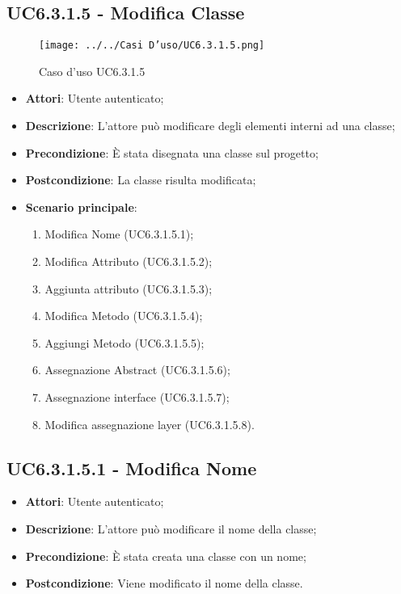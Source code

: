 \subsection{UC6.3.1.5 - Modifica Classe} 
\label{ssec:UC6.3.1.5} 
\begin{figure}[h!] 
\centering 
\texttt{[image: ../../Casi D'uso/UC6.3.1.5.png]} 
\caption{Caso d'uso UC6.3.1.5} 
 \end{figure} 
\begin{itemize} 
\item \textbf{Attori}: Utente autenticato;
\item \textbf{Descrizione}: L'attore può modificare degli elementi interni ad una classe;
\item \textbf{Precondizione}: È stata disegnata una classe sul progetto;
\item \textbf{Postcondizione}: La classe risulta modificata;
\item \textbf{Scenario principale}: \begin{enumerate}\item Modifica Nome (UC6.3.1.5.1);\item Modifica Attributo (UC6.3.1.5.2);\item Aggiunta attributo (UC6.3.1.5.3);\item Modifica Metodo (UC6.3.1.5.4);\item Aggiungi Metodo (UC6.3.1.5.5);\item Assegnazione Abstract (UC6.3.1.5.6);\item Assegnazione interface (UC6.3.1.5.7);\item Modifica assegnazione layer (UC6.3.1.5.8). 
 \end{enumerate}
\end{itemize} 
\subsection{UC6.3.1.5.1 - Modifica Nome} 
\label{ssec:UC6.3.1.5.1} 
\begin{itemize} 
\item \textbf{Attori}: Utente autenticato;
\item \textbf{Descrizione}: L'attore può modificare il nome della classe;
\item \textbf{Precondizione}: È stata creata una classe con un nome;
\item \textbf{Postcondizione}: Viene modificato il nome della classe.
\end{itemize} 
